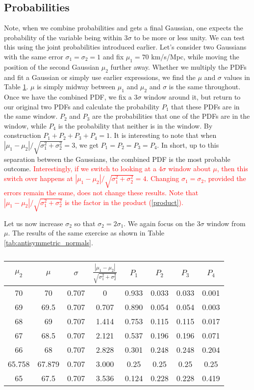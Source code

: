 \documentclass[aps,prl,10pt,twocolumn,superscriptaddress]{revtex4}
\def\red{\textcolor{red}}
\begin{document}
\subsection{Probabilities}
Note, when we combine probabilities and gets a final Gaussian, one expects the probability of the variable being within $3 \sigma$ to be more or less unity. We can test this using the joint probabilities introduced earlier. Let's consider two Gaussians with the same error $\sigma_1 = \sigma_2 = 1$ and fix $\mu_1 = 70$ km/s/Mpc, while moving the position of the second Gaussian $\mu_2$ further away. Whether we multiply the PDFs and fit a Gaussian or simply use earlier expressions, we find the $\mu$ and $\sigma$ values in Table \ref{tab:symmetric_normals}. $\mu$ is simply midway between $\mu_1$ and $\mu_2$ and $\sigma$ is the same throughout. Once we have the combined PDF, we fix a $3 \sigma$ window around it, but return to our original two PDFs and calculate the probability $P_1$ that these PDFs are in the same window. $P_2$ and $P_3$ are the probabilities that one of the PDFs are in the window, while $P_4$ is the probability that neither is in the window. By construction $P_1 + P_2 + P_3 + P_4 = 1$. It is interesting to note that when $|\mu_1 - \mu_2|/\sqrt{\sigma_1^2+\sigma_2^2} = 3$, we get $P_1 = P_2 = P_3 = P_4$. In short, up to this separation between the Gaussians, the combined PDF is the most probable outcome. \red{Interestingly, if we switch to looking at a $4 \sigma$ window about $\mu$, then this switch over happens at $|\mu_1 - \mu_2|/\sqrt{\sigma_1^2+\sigma_2^2} = 4$. Changing $\sigma_1 = \sigma_2$, provided the errors remain the same, does not change these results. Note that $|\mu_1 - \mu_2|/\sqrt{\sigma_1^2+\sigma_2^2}$ is the factor in the product (\ref{product}).}  

Let us now increase $\sigma_2$ so that $\sigma_2=2 \sigma_1$. We again focus on the $3 \sigma$ window from $\mu$. The results of the same exercise as shown in Table \ref{tab:antisymmetric_normals}. 


\begin{table}[htb]
    \centering
    \begin{tabular}{c|c|c|c|c|c|c|c}
    $\mu_2$ & $\mu$ & $\sigma$ & $\frac{|\mu_1-\mu_2|}{\sqrt{\sigma_1^2+\sigma_2^2}}$ & $P_1$ & $P_2$ & $P_3$ & $P_4$ \\
    \hline
    70 & 70 & 0.707 & 0 & 0.933 & 0.033 & 0.033 & 0.001\\
    69 & 69.5 & 0.707 & 0.707 & 0.890 & 0.054 & 0.054 & 0.003 \\
    68 & 69 & 0.707 & 1.414 & 0.753 & 0.115 & 0.115 & 0.017 \\
     67 & 68.5 & 0.707 & 2.121 & 0.537 & 0.196 & 0.196 & 0.071 \\
     66 & 68 & 0.707 & 2.828 & 0.301 & 0.248 & 0.248 & 0.204 \\
      65.758 & 67.879 & 0.707 & 3.000 & 0.25 & 0.25 & 0.25 & 0.25 \\
     65 & 67.5 & 0.707 & 3.536 & 0.124 & 0.228 & 0.228 & 0.419 \\
    \end{tabular}
    \caption{}
    \label{tab:symmetric_normals}
\end{table}
\end{document}
